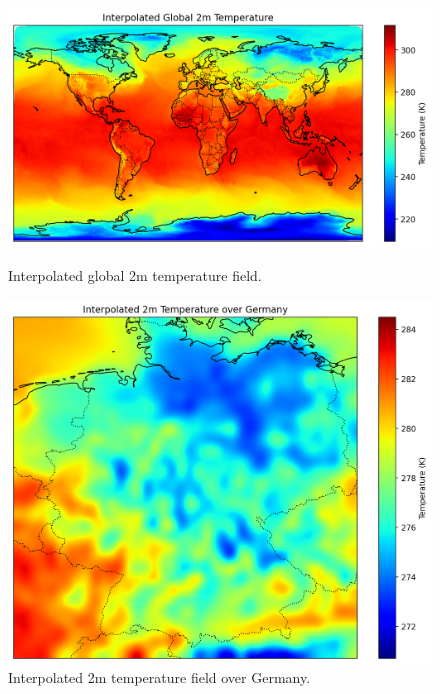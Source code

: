 \begin{figure}[ht]
    \centering
    \begin{minipage}{0.5\textwidth}
        \centering
        \includegraphics[width=\textwidth]{images/icon_t2m_global_interp.png}
        \caption{Interpolated global 2m temperature field.}
        \label{fig:t2m_global_interp}
    \end{minipage}
    \hfill
    \begin{minipage}{0.4\textwidth}
        \centering
        \includegraphics[width=\textwidth]{images/icon_t2m_germany_interp.png}
        \caption{Interpolated 2m temperature field over Germany.}
        \label{fig:t2m_germany_interp}
    \end{minipage}
\end{figure}

